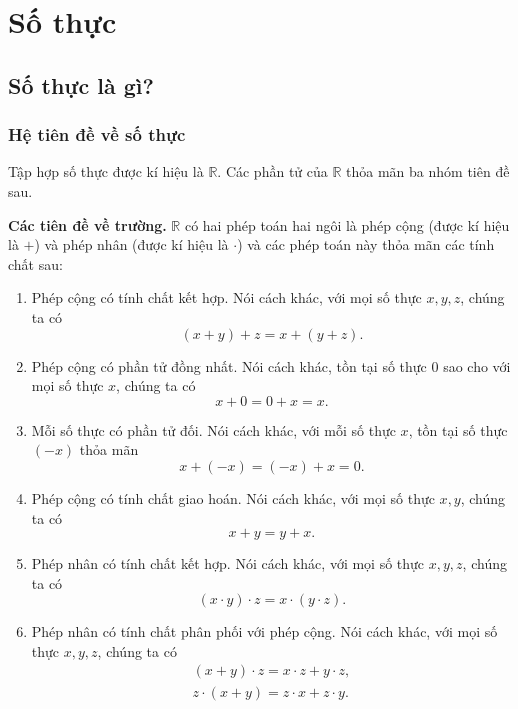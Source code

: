 \chapter{Số thực}\label{chapter:real-numbers}

\section{Số thực là gì?}

\subsection{Hệ tiên đề về số thực}

\begin{axiom}
	Tập hợp số thực được kí hiệu là $\mathbb{R}$. Các phần tử của $\mathbb{R}$ thỏa mãn ba nhóm tiên đề sau.

	\textbf{Các tiên đề về trường.} $\mathbb{R}$ có hai phép toán hai ngôi là phép cộng (được kí hiệu là $+$) và phép nhân (được kí hiệu là $\cdot$) và các phép toán này thỏa mãn các tính chất sau:
	\begin{enumerate}[label={(\roman*)}]
		\item Phép cộng có tính chất kết hợp. Nói cách khác, với mọi số thực $x, y, z$, chúng ta có
		      \[
			      (x + y) + z = x + (y + z).
		      \]
		\item Phép cộng có phần tử đồng nhất. Nói cách khác, tồn tại số thực $0$ sao cho với mọi số thực $x$, chúng ta có
		      \[
			      x + 0 = 0 + x = x.
		      \]
		\item Mỗi số thực có phần tử đối. Nói cách khác, với mỗi số thực $x$, tồn tại số thực $(-x)$ thỏa mãn
		      \[
			      x + (-x) = (-x) + x = 0.
		      \]
		\item Phép cộng có tính chất giao hoán. Nói cách khác, với mọi số thực $x, y$, chúng ta có
		      \[
			      x + y = y + x.
		      \]
		\item Phép nhân có tính chất kết hợp. Nói cách khác, với mọi số thực $x, y, z$, chúng ta có
		      \[
			      (x \cdot y) \cdot z = x \cdot (y \cdot z).
		      \]
		\item Phép nhân có tính chất phân phối với phép cộng. Nói cách khác, với mọi số thực $x, y, z$, chúng ta có
		      \[
			      \begin{split}
				      (x + y)\cdot z = x\cdot z + y\cdot z, \\
				      z\cdot (x + y) = z\cdot x + z\cdot y.
			      \end{split}
		      \]


\end{enumerate}
\end{axiom}
